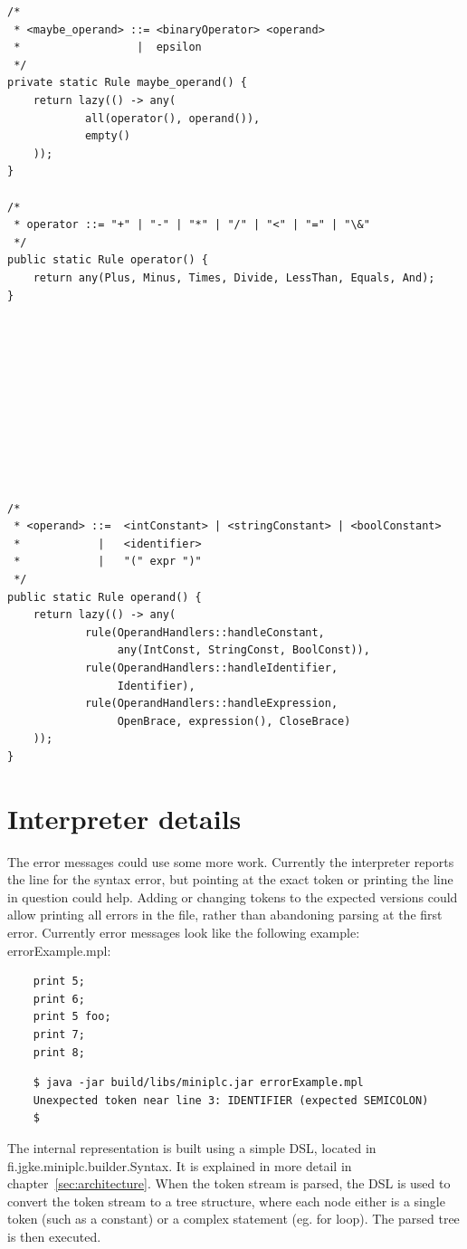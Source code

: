 \documentclass{article}
\begin{document}
\begin{verbatim}
/*
 * <maybe_operand> ::= <binaryOperator> <operand>
 *                  |  epsilon
 */
private static Rule maybe_operand() {
    return lazy(() -> any(
            all(operator(), operand()),
            empty()
    ));
}

/*
 * operator ::= "+" | "-" | "*" | "/" | "<" | "=" | "\&"
 */
public static Rule operator() {
    return any(Plus, Minus, Times, Divide, LessThan, Equals, And);
}











/*
 * <operand> ::=  <intConstant> | <stringConstant> | <boolConstant>
 *            |   <identifier>
 *            |   "(" expr ")"
 */
public static Rule operand() {
    return lazy(() -> any(
            rule(OperandHandlers::handleConstant,
                 any(IntConst, StringConst, BoolConst)),
            rule(OperandHandlers::handleIdentifier,
                 Identifier),
            rule(OperandHandlers::handleExpression,
                 OpenBrace, expression(), CloseBrace)
    ));
}
\end{verbatim}

\section{Interpreter details}
The error messages could use some more work. Currently the interpreter reports
the line for the syntax error, but pointing at the exact token or printing the
line in question could help. Adding or changing tokens to the expected versions
could allow printing all errors in the file, rather than abandoning parsing at
the first error. Currently error messages look like the following example: \\[0.5em]
errorExample.mpl:
\begin{verbatim}
    print 5;
    print 6;
    print 5 foo;
    print 7;
    print 8;
\end{verbatim}
\begin{verbatim}
    $ java -jar build/libs/miniplc.jar errorExample.mpl
    Unexpected token near line 3: IDENTIFIER (expected SEMICOLON)
    $
\end{verbatim}

The internal representation is built using a simple DSL, located in
fi.jgke.miniplc.builder.Syntax. It is explained in more detail in
chapter~\ref{sec:architecture}. When the token stream is parsed, the DSL is
used to convert the token stream to a tree structure, where each node either
is a single token (such as a constant) or a complex statement (eg. for loop).
The parsed tree is then executed.
\end{document}
